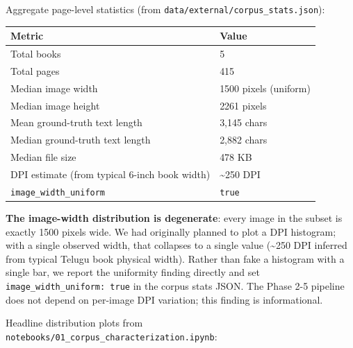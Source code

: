 \documentclass[
  letterpaper,
  DIV=11,
  numbers=noendperiod]{scrartcl}
\newcounter{none} %
\begin{document}
Aggregate page-level statistics (from
\texttt{data/external/corpus\_stats.json}):

{\def\LTcaptype{none} %
\begin{longtable}[]{@{}ll@{}}
\toprule\noalign{}
Metric & Value \\
\midrule\noalign{}
\endhead
\bottomrule\noalign{}
\endlastfoot
Total books & 5 \\
Total pages & 415 \\
Median image width & 1500 pixels (uniform) \\
Median image height & 2261 pixels \\
Mean ground-truth text length & 3,145 chars \\
Median ground-truth text length & 2,882 chars \\
Median file size & 478 KB \\
DPI estimate (from typical 6-inch book width) & \textasciitilde250
DPI \\
\texttt{image\_width\_uniform} & \texttt{true} \\
\end{longtable}
}

\textbf{The image-width distribution is degenerate}: every image in the
subset is exactly 1500 pixels wide. We had originally planned to plot a
DPI histogram; with a single observed width, that collapses to a single
value (\textasciitilde250 DPI inferred from typical Telugu book physical
width). Rather than fake a histogram with a single bar, we report the
uniformity finding directly and set
\texttt{image\_width\_uniform:\ true} in the corpus stats JSON. The
Phase 2-5 pipeline does not depend on per-image DPI variation; this
finding is informational.

Headline distribution plots from
\texttt{notebooks/01\_corpus\_characterization.ipynb}:
\end{document}
